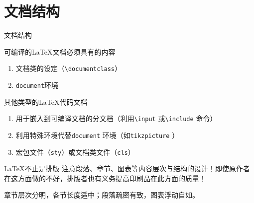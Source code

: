 \documentclass[10pt]{beamer}
\begin{document}
\section{文档结构}
\begin{frame}{文档结构}
\begin{block}{可编译的\LaTeX{}文档必须具有的内容}
\begin{enumerate}
    \item 文档类的设定（\texttt{\textbackslash{}documentclass}）
    \item \texttt{document}环境
\end{enumerate}
\end{block}
\begin{block}{其他类型的\LaTeX{}代码文档}
\begin{enumerate}
    \item 用于嵌入到可编译文档的分文档（利用\texttt{\textbackslash{}input} 或\texttt{\textbackslash{}include} 命令）
    \item 利用特殊环境代替\texttt{document} 环境（如\texttt{tikzpicture} ）
    \item 宏包文件（\texttt{sty}）或文档类文件（\texttt{cls}）
\end{enumerate}
\end{block}
\begin{alertblock}{\LaTeX{}不止是排版}
注意段落、章节、图表等内容层次与结构的设计！即使原作者在这方面做的不好，排版者也有义务提高印刷品在此方面的质量！

章节层次分明，各节长度适中；段落疏密有致，图表浮动自如。
\end{alertblock}
\end{frame}
\end{document}
